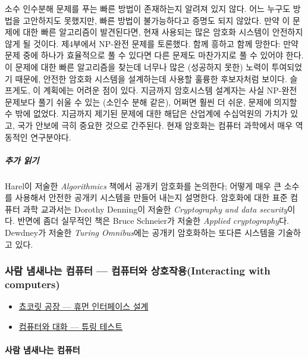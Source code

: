 \documentclass[]{article}
\begin{document}
소수 인수분해 문제를 푸는 빠른 방법이 존재하는지 알려져 있지 않다. 어느
누구도 방법을 고안하지도 못했지만, 빠른 방법이 불가능하다고 증명도 되지
않았다. 만약 이 문제에 대한 빠른 알고리즘이 발견된다면, 현재 사용되는
많은 암호화 시스템이 안전하지 않게 될 것이다. 제4부에서 NP-완전 문제를
토론했다. 함께 흥하고 함께 망한다: 만약 문제 중에 하나가 효율적으로 풀
수 있다면 다른 문제도 마찬가지로 풀 수 있어야 한다. 이 문제에 대한 빠른
알고리즘을 찾는데 너무나 많은 (성공하지 못한) 노력이 투여되었기 때문에,
안전한 암호화 시스템을 설계하는데 사용할 훌륭한 후보자처럼 보이다.
슬프게도, 이 계획에는 어려운 점이 있다. 지금까지 암호시스템 설계자는
사실 NP-완전 문제보다 풀기 쉬울 수 있는 (소인수 분해 같은), 어쩌면 훨씬
더 쉬운, 문제에 의지할 수 밖에 없었다. 지금까지 제기된 문제에 대한
해답은 산업계에 수십억원의 가치가 있고, 국가 안보에 극히 중요한 것으로
간주된다. 현재 암호화는 컴퓨터 과학에서 매우 역동적인 연구분야다.

\subparagraph{추가 읽기}\label{section-254}

Harel이 저술한 \emph{Algorithmics} 책에서 공개키 암호화를 논의한다;
어떻게 매우 큰 소수를 사용해서 안전한 공개키 시스템을 만들어 내는지
설명한다. 암호화에 대한 표준 컴퓨터 과학 교과서는 Dorothy Denning이
저술한 \emph{Cryptography and data security}이다. 반면에 좀더 실무적인
책은 Bruce Schneier가 저술한 \emph{Applied cryptography}다. Dewdney가
저술한 \emph{Turing Omnibus}에는 공개키 암호화하는 또다른 시스템을
기술하고 있다.


\subsubsection{사람 냄새나는 컴퓨터 --- 컴퓨터와 상호작용(Interacting
with computers)}\label{mdash--interacting-with-computers}

\begin{itemize}
\itemsep1pt\parskip0pt
\item
  \href{csunplugged/06-part/20-hci.html}{쵸코릿 공장 --- 휴먼 인터페이스
  설계}
\item
  \href{csunplugged/06-part/21-turing.html}{컴퓨터와 대화 --- 튜링
  테스트}
\end{itemize}

\mbox{}\paragraph{사람 냄새나는 컴퓨터}\label{section-255}
\end{document}

